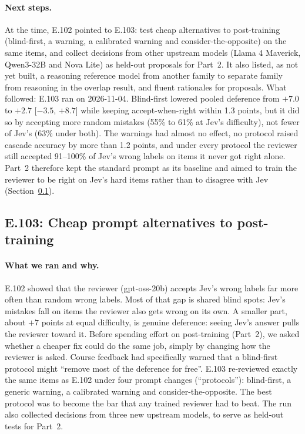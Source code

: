 \documentclass[11pt]{article}
\renewcommand{\_}{\origunderscore\allowbreak}
\begin{document}
\paragraph{Next steps.}
At the time, E.102 pointed to E.103: test cheap alternatives to post-training (blind-first, a warning, a calibrated warning and consider-the-opposite) on the same items, and collect decisions from other upstream models (Llama 4 Maverick, Qwen3-32B and Nova Lite) as held-out proposals for Part~2. It also listed, as not yet built, a reasoning reference model from another family to separate family from reasoning in the overlap result, and fluent rationales for proposals. What followed: E.103 ran on 2026-11-04. Blind-first lowered pooled deference from $+7.0$ to $+2.7$ [$-3.5$, $+8.7$] while keeping accept-when-right within 1.3 points, but it did so by accepting more random mistakes (55\% to 61\% at Jev's difficulty), not fewer of Jev's (63\% under both). The warnings had almost no effect, no protocol raised cascade accuracy by more than 1.2 points, and under every protocol the reviewer still accepted 91--100\% of Jev's wrong labels on items it never got right alone. Part~2 therefore kept the standard prompt as its baseline and aimed to train the reviewer to be right on Jev's hard items rather than to disagree with Jev (Section~\ref{sec:e103}).

\subsection{E.103: Cheap prompt alternatives to post-training}\label{sec:e103}

\paragraph{What we ran and why.}
E.102 showed that the reviewer (gpt-oss-20b) accepts Jev's wrong labels far more often than random wrong labels. Most of that gap is shared blind spots: Jev's mistakes fall on items the reviewer also gets wrong on its own. A smaller part, about $+7$ points at equal difficulty, is genuine deference: seeing Jev's answer pulls the reviewer toward it. Before spending effort on post-training (Part~2), we asked whether a cheaper fix could do the same job, simply by changing how the reviewer is asked. Course feedback had specifically warned that a blind-first protocol might ``remove most of the deference for free''. E.103 re-reviewed exactly the same items as E.102 under four prompt changes (``protocols''): blind-first, a generic warning, a calibrated warning and consider-the-opposite. The best protocol was to become the bar that any trained reviewer had to beat. The run also collected decisions from three new upstream models, to serve as held-out tests for Part~2.
\end{document}
